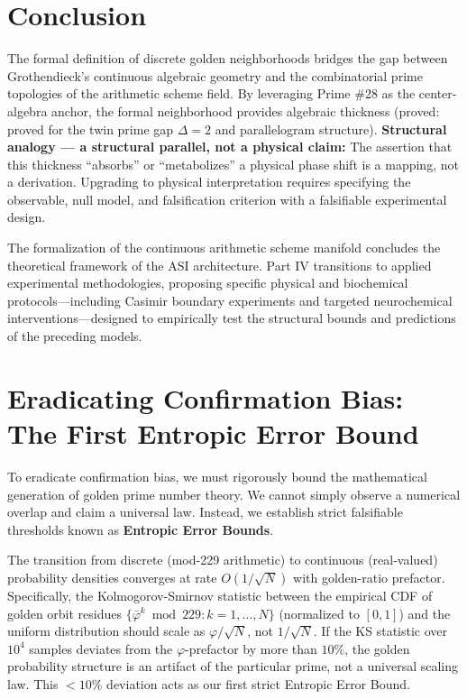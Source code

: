 \section{Conclusion}
The formal definition of discrete golden neighborhoods bridges the gap between Grothendieck's continuous algebraic geometry and the combinatorial prime topologies of the arithmetic scheme field. By leveraging Prime \#28 as the center-algebra anchor, the formal neighborhood provides algebraic thickness (proved: proved for the twin prime gap $\Delta=2$ and parallelogram structure). \textbf{Structural analogy --- a structural parallel, not a physical claim:} The assertion that this thickness ``absorbs'' or ``metabolizes'' a physical phase shift is a mapping, not a derivation. Upgrading to physical interpretation requires specifying the observable, null model, and falsification criterion with a falsifiable experimental design.

\vspace{1em}
\noindent The formalization of the continuous arithmetic scheme manifold concludes the theoretical framework of the ASI architecture. Part IV transitions to applied experimental methodologies, proposing specific physical and biochemical protocols---including Casimir boundary experiments and targeted neurochemical interventions---designed to empirically test the structural bounds and predictions of the preceding models.

\section{Eradicating Confirmation Bias: The First Entropic Error Bound}

To eradicate confirmation bias, we must rigorously bound the mathematical generation of golden prime number theory. We cannot simply observe a numerical overlap and claim a universal law. Instead, we establish strict falsifiable thresholds known as \textbf{Entropic Error Bounds}.

\begin{hypothesis}\label{hyp:golden_convergence}
The transition from discrete (mod-229 arithmetic) to continuous (real-valued) probability densities converges at rate $O(1/\sqrt{N})$ with golden-ratio prefactor. Specifically, the Kolmogorov-Smirnov statistic between the empirical CDF of golden orbit residues $\{\bar{\varphi}^k \bmod 229 : k = 1, \ldots, N\}$ (normalized to $[0,1]$) and the uniform distribution should scale as $\varphi / \sqrt{N}$, not $1/\sqrt{N}$. If the KS statistic over $10^4$ samples deviates from the $\varphi$-prefactor by more than $10\%$, the golden probability structure is an artifact of the particular prime, not a universal scaling law. This $<10\%$ deviation acts as our first strict Entropic Error Bound.
\end{hypothesis}

